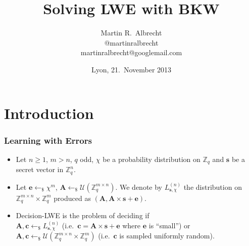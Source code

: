 \documentclass[10pt]{beamer}
\title{Solving LWE with BKW}
\author[Martin R.\ Albrecht]{Martin R.\ Albrecht\\{\small @martinralbrecht}\\{\small martinralbrecht@googlemail.com}}
\institute[Universities of Somewhere and Elsewhere] %
{joint work with C.\ Cid, J.-C.\ Faugère, R.\ Fitzpatrick, and L.\ Perret}
\date{Lyon, 21.\ November 2013}
\newcommand{\U}[1]{\ensuremath{\mathcal{U}(#1)\xspace}}
\renewcommand{\vec}[1]{\mathbf{#1}\xspace}
\newcommand{\Z}{\ensuremath{\mathbb{Z}}\xspace}
\newcommand{\Ldis}{L_{\mathbf{s},\chi}^{(n)}\xspace}
\newcommand{\sample}{\ensuremath{\leftarrow_{\$}}}
\begin{document}
\begin{frame}[plain] %
  \titlepage
\end{frame}



\section{Introduction}

\begin{frame}
\frametitle{Learning with Errors}
\begin{definition}
\begin{itemize}
\item Let $n\geq 1$, $m > n$, $q$ odd, $\chi$ be a probability distribution on $\Z_q$ and $\vec{s}$ be a secret vector in $\Z_q^n$.
\pause
\item Let $\vec{e} \sample \chi^m$, $\vec{A} \sample \U{\Z_q^{m \times n}}$. We denote by $\Ldis$ the distribution on $\Z_q^{m \times n} \times \Z_q^m$ produced as $(\vec{A}, \vec{A} \times \vec{s} + \vec{e})$.
\pause
\item Decision-LWE is the problem of deciding if\\$\vec{A},\vec{c} \sample \Ldis$ (i.e.\ $\vec{c} = \vec{A} \times \vec{s} + \vec{e}$ where $\vec{e}$ is ``small'') or\\ $\vec{A},\vec{c} \sample \U{\Z_q^{m\times n} \times \Z_q^{m}}$ (i.e.\ $\vec{c}$ is sampled uniformly random).
\end{itemize}
\end{definition}

\end{frame}
\end{document}
